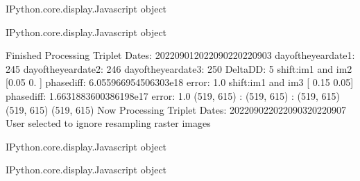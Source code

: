 \documentclass[letterpaper,10pt]{sphinxmanual}
\begin{document}
\begin{sphinxVerbatim}[commandchars=\\\{\}]
\PYGZlt{}IPython.core.display.Javascript object\PYGZgt{}
\end{sphinxVerbatim}



\begin{sphinxVerbatim}[commandchars=\\\{\}]
\PYGZlt{}IPython.core.display.Javascript object\PYGZgt{}
\end{sphinxVerbatim}



\begin{sphinxVerbatim}[commandchars=\\\{\}]
Finished Processing Triplet Dates:  20220901\PYGZhy{}20220902\PYGZhy{}20220903
day\PYGZus{}of\PYGZus{}the\PYGZus{}year\PYGZus{}date1:  245
\PYGZhy{}\PYGZhy{}\PYGZhy{}\PYGZhy{}\PYGZhy{}\PYGZhy{}\PYGZhy{}\PYGZhy{}\PYGZhy{}\PYGZhy{}\PYGZhy{}\PYGZhy{}\PYGZhy{}\PYGZhy{}\PYGZhy{}\PYGZhy{}\PYGZhy{}\PYGZhy{}\PYGZhy{}\PYGZhy{}\PYGZhy{}
day\PYGZus{}of\PYGZus{}the\PYGZus{}year\PYGZus{}date2:  246
\PYGZhy{}\PYGZhy{}\PYGZhy{}\PYGZhy{}\PYGZhy{}\PYGZhy{}\PYGZhy{}\PYGZhy{}\PYGZhy{}\PYGZhy{}\PYGZhy{}\PYGZhy{}\PYGZhy{}\PYGZhy{}\PYGZhy{}\PYGZhy{}\PYGZhy{}\PYGZhy{}\PYGZhy{}\PYGZhy{}\PYGZhy{}
day\PYGZus{}of\PYGZus{}the\PYGZus{}year\PYGZus{}date3:  250
\PYGZhy{}\PYGZhy{}\PYGZhy{}\PYGZhy{}\PYGZhy{}\PYGZhy{}\PYGZhy{}\PYGZhy{}\PYGZhy{}\PYGZhy{}\PYGZhy{}\PYGZhy{}\PYGZhy{}\PYGZhy{}\PYGZhy{}\PYGZhy{}\PYGZhy{}\PYGZhy{}\PYGZhy{}\PYGZhy{}\PYGZhy{}
Delta\PYGZus{}DD: 5
shift:im1 and im2 [\PYGZhy{}0.05  0.  ] phasediff: 6.055966954506303e\PYGZhy{}18 error: 1.0
shift:im1 and im3 [ 0.15 \PYGZhy{}0.05] phasediff: \PYGZhy{}1.6631883600386198e\PYGZhy{}17 error: 1.0
(519, 615) :  (519, 615) :  (519, 615)
(519, 615)
(519, 615)
Now Processing Triplet Dates:  20220902\PYGZhy{}20220903\PYGZhy{}20220907
 User selected to ignore resampling raster images 



\PYGZlt{}IPython.core.display.Javascript object\PYGZgt{}
\end{sphinxVerbatim}



\begin{sphinxVerbatim}[commandchars=\\\{\}]
\PYGZlt{}IPython.core.display.Javascript object\PYGZgt{}
\end{sphinxVerbatim}
\end{document}
